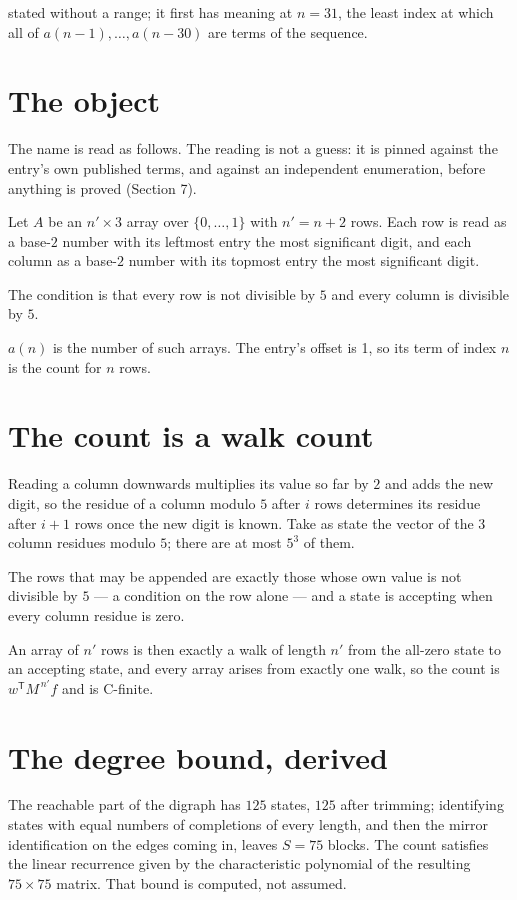 \documentclass[11pt]{article}
\theoremstyle{definition}
\begin{document}
stated without a range; it first has meaning at $n = 31$, the least index at which all of $a(n-1),\dots,a(n-30)$ are terms of the sequence.

\section{The object}

The name is read as follows. The reading is not a guess: it is pinned against the entry's own published terms, and against an independent enumeration, before anything is proved (Section 7).

Let $A$ be an $n' \times 3$ array over $\{0,\dots,1\}$ with $n' = n + 2$ rows. Each row is read as a base-$2$ number with its leftmost entry the most significant digit, and each column as a base-$2$ number with its topmost entry the most significant digit.

The condition is that every row is not divisible by $5$ and every column is divisible by $5$.

$a(n)$ is the number of such arrays. The entry's offset is 1, so its term of index $n$ is the count for $n$ rows.

\section{The count is a walk count}

Reading a column downwards multiplies its value so far by $2$ and adds the new digit, so the residue of a column modulo $5$ after $i$ rows determines its residue after $i+1$ rows once the new digit is known. Take as state the vector of the $3$ column residues modulo $5$; there are at most $5^{3}$ of them.

The rows that may be appended are exactly those whose own value is not divisible by $5$ --- a condition on the row alone --- and a state is accepting when every column residue is zero.

An array of $n'$ rows is then exactly a walk of length $n'$ from the all-zero state to an accepting state, and every array arises from exactly one walk, so the count is $w^{\mathsf T}M^{\,n'}f$ and is C-finite.

\section{The degree bound, derived}

The reachable part of the digraph has $125$ states, $125$ after trimming; identifying states with equal numbers of completions of every length, and then the mirror identification on the edges coming in, leaves $S = 75$ blocks. The count satisfies the linear recurrence given by the characteristic polynomial of the resulting $75\times75$ matrix. That bound is computed, not assumed.
\end{document}
